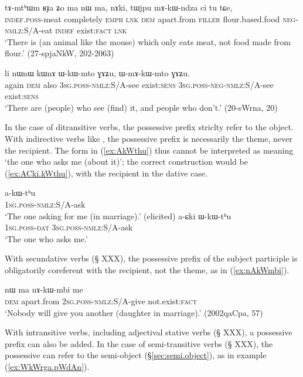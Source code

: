  \begin{exe} 
\ex \label{ex:mAkWndza}
\gll  tɤ-mtʰɯm ʁɟa ʑo ma nɯ ma, nɤki, tɯjpu mɤ-kɯ-ndza ci tu tɕe, \\
\textsc{indef}.\textsc{poss}-meat completely \textsc{emph} \textsc{lnk} \textsc{dem} apart.from \textsc{filler} flour.based.food \textsc{neg}-\textsc{nmlz}:S/A-eat \textsc{indef} exist:\textsc{fact} \textsc{lnk} \\
\glt  `There is (an animal like the mouse) which only eats meat, not food made from flour.' (27-spjaNkW, 202-2063)
\end{exe}

 \begin{exe} 
\ex \label{ex:WmAkWmto} 
\gll  li nɯnɯ kɯnɤ ɯ-kɯ-mto ɣɤʑu, ɯ-mɤ-kɯ-mto ɣɤʑu. \\
again \textsc{dem} also \textsc{3sg}.\textsc{poss}-\textsc{nmlz}:S/A-see exist:\textsc{sens} \textsc{3sg}.\textsc{poss}-\textsc{neg}-\textsc{nmlz}:S/A-see exist:\textsc{sens} \\
\glt `There are (people) who see (find) it, and people who don't.' (20-sWrna, 20)
\end{exe}

In the case of ditransitive verbs, the possessive prefix striclty refer to the object. With indirective verbs like , the possessive prefix is necessarily the theme, never the recipient. The form in (\ref{ex:AkWthu}) thus cannot be interpreted as meaning `the one who asks me (about it)'; the correct construction would be (\ref{ex:ACki.kWthu}), with the recipient in the dative case.

\begin{exe}
\ex \label{ex:AkWthu}
\gll a-kɯ-tʰu  \\
\textsc{1sg.poss}-\textsc{nmlz}:S/A-ask \\
\glt `The one asking for me (in marriage).' (elicited)
\ex \label{ex:ACki.kWthu}
\gll a-ɕki ɯ-kɯ-tʰu  \\
\textsc{1sg.poss}-\textsc{dat} \textsc{3sg}.\textsc{poss}-\textsc{nmlz}:S/A-ask \\ 
\glt `The one who asks me.' 
\end{exe}

With secundative verbs (§ XXX), the possessive prefix of the subject participle is obligatorily coreferent with the recipient, not the theme, as in (\ref{ex:nAkWmbi}).

\begin{exe}
\ex \label{ex:nAkWmbi}
\gll nɯ ma nɤ-kɯ-mbi me \\
\textsc{dem} apart.from \textsc{2sg}.\textsc{poss}-\textsc{nmlz}:S/A-give not.exist:\textsc{fact} \\
\glt `Nobody will give you another (daughter in marriage).' (2002qaCpa, 57)
\end{exe}
With intransitive verbs, including adjectival stative verbs (§ XXX), a possessive prefix can also be added. In the case of semi-transitive verbs (§ XXX), the possessive can refer to the semi-object (§\ref{sec:semi.object}), as in example (\ref{ex:WkWrga.pWdAn}).

